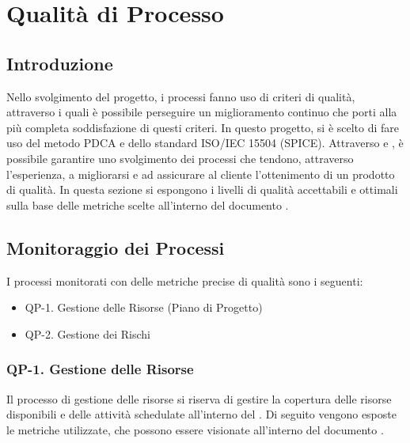 \section{Qualità di Processo}

\subsection{Introduzione}

Nello svolgimento del progetto, i processi fanno uso di criteri di qualità, attraverso i quali è possibile perseguire un miglioramento continuo che porti alla più completa soddisfazione di questi criteri. In questo progetto, si è scelto di fare uso del metodo PDCA e dello standard ISO/IEC 15504 (SPICE). Attraverso  e , è possibile garantire uno svolgimento dei processi che tendono, attraverso l'esperienza, a migliorarsi e ad assicurare al cliente l'ottenimento di un prodotto di qualità.
In questa sezione si espongono i livelli di qualità accettabili e ottimali sulla base delle metriche scelte all'interno del documento .

\subsection{Monitoraggio dei Processi}

I processi monitorati con delle metriche precise di qualità sono i seguenti:

\begin{itemize}
	\item QP-1. Gestione delle Risorse (Piano di Progetto)
	\item QP-2. Gestione dei Rischi
\end{itemize}

	\subsubsection{QP-1. Gestione delle Risorse}

		Il processo di gestione delle risorse si riserva di gestire la copertura delle risorse disponibili e delle attività schedulate all'interno del . Di seguito vengono esposte le metriche utilizzate, che possono essere visionate all'interno del documento .

